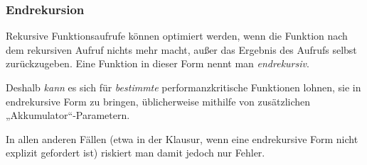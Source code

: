 \documentclass{beamer}
\begin{document}
\begin{frame}
  \frametitle{Endrekursion}
  Rekursive Funktionsaufrufe können optimiert werden,
  wenn die Funktion nach dem rekursiven Aufruf nichts mehr macht,
  außer das Ergebnis des Aufrufs selbst zurückzugeben.
  Eine Funktion in dieser Form nennt man \emph{endrekursiv}.
  
  Deshalb \emph{kann} es sich für \emph{bestimmte} performanzkritische Funktionen lohnen,
  sie in endrekursive Form zu bringen,
  üblicherweise mithilfe von zusätzlichen „Akkumulator“-Parametern.
  
  In allen anderen Fällen
  (etwa in der Klausur, wenn eine endrekursive Form nicht explizit gefordert ist)
  riskiert man damit jedoch nur Fehler.
\end{frame}
\end{document}
